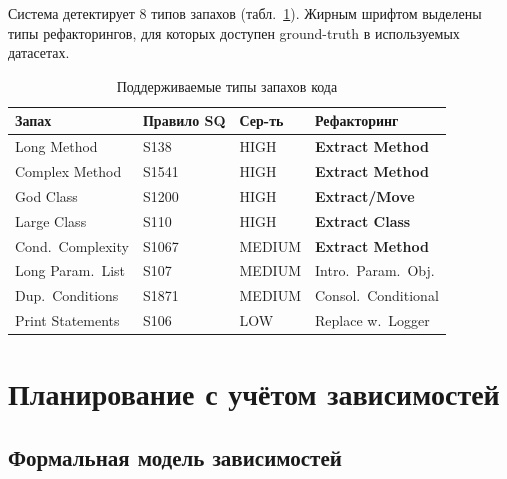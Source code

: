\documentclass[conference]{IEEEtran}
\begin{document}
Система детектирует 8 типов запахов (табл.~\ref{tab:smells}).
Жирным шрифтом выделены типы рефакторингов, для которых доступен
ground-truth в используемых датасетах.

\begin{table}[tb]
\caption{Поддерживаемые типы запахов кода}
\label{tab:smells}
\centering
\footnotesize
\setlength{\tabcolsep}{3.5pt}
\begin{tabular}{@{}llll@{}}
\toprule
\textbf{Запах} & \textbf{Правило SQ} & \textbf{Сер-ть} & \textbf{Рефакторинг} \\
\midrule
Long Method          & S138  & HIGH   & \textbf{Extract Method} \\
Complex Method       & S1541 & HIGH   & \textbf{Extract Method} \\
God Class            & S1200 & HIGH   & \textbf{Extract/Move} \\
Large Class          & S110  & HIGH   & \textbf{Extract Class} \\
Cond.\ Complexity    & S1067 & MEDIUM & \textbf{Extract Method} \\
Long Param.\ List    & S107  & MEDIUM & Intro.\ Param.\ Obj. \\
Dup.\ Conditions     & S1871 & MEDIUM & Consol.\ Conditional \\
Print Statements     & S106  & LOW    & Replace w.\ Logger \\
\bottomrule
\end{tabular}
\end{table}

\section{Планирование с учётом зависимостей}

\subsection{Формальная модель зависимостей}
\end{document}
